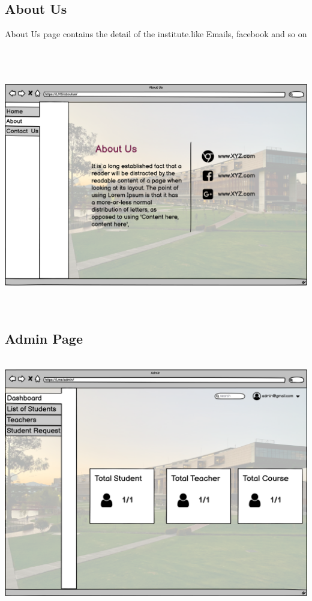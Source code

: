 \subsection{About Us}
\caption{About Us page contains the detail of the institute.like Emails, facebook and so on }
\\
\includegraphics[width=18cm, height=11cm]{HW_1/images/New Wireframe 2.png}


\subsection{Admin Page}

\includegraphics[width=18cm, height=11cm]{HW_1/images/Admin Page.png}

